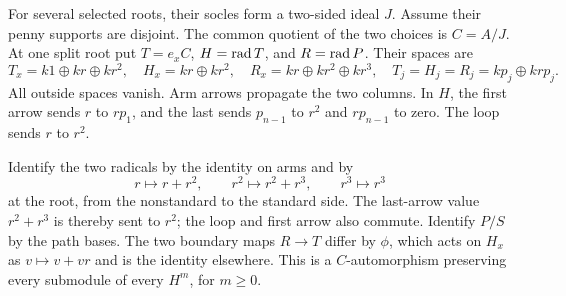For several selected roots, their socles form a two-sided ideal $J$. Assume their penny supports are disjoint. The common quotient of the two choices is $C=A/J$. At one split root put $T=e_xC$, $H=\operatorname{rad} T$, and $R=\operatorname{rad} P$. Their spaces are
\[
 T_x=k1\oplus kr\oplus kr^2,\quad H_x=kr\oplus kr^2,
 \quad R_x=kr\oplus kr^2\oplus kr^3,
 \quad T_j=H_j=R_j=kp_j\oplus krp_j.
\]
All outside spaces vanish. Arm arrows propagate the two columns. In $H$, the first arrow sends $r$ to $rp_1$, and the last sends $p_{n-1}$ to $r^2$ and $rp_{n-1}$ to zero. The loop sends $r$ to $r^2$.

Identify the two radicals by the identity on arms and by
\begin{equation}\label{eq:radical-identification}
 r\longmapsto r+r^2,\qquad r^2\longmapsto r^2+r^3,
 \qquad r^3\longmapsto r^3
\end{equation}
at the root, from the nonstandard to the standard side. The last-arrow value $r^2+r^3$ is thereby sent to $r^2$; the loop and first arrow also commute. Identify $P/S$ by the path bases. The two boundary maps $R\to T$ differ by $\phi$, which acts on $H_x$ as $v\mapsto v+vr$ and is the identity elsewhere. This is a $C$-automorphism preserving every submodule of every $H^m$, for $m\ge0$.

